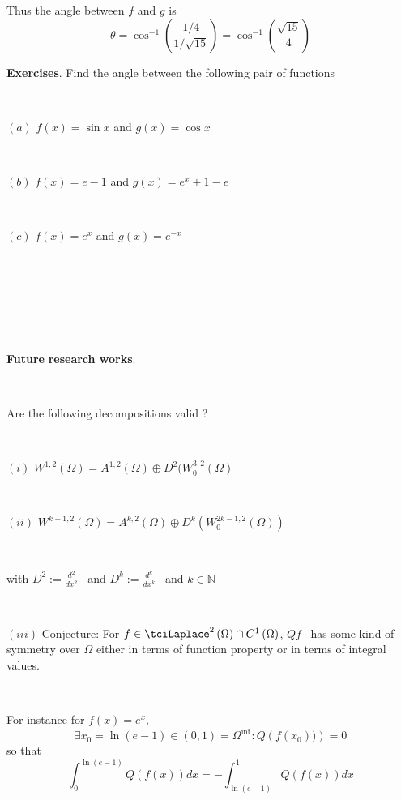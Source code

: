 \documentclass{amsproc}
\theoremstyle{plain}
\numberwithin{equation}{section}
\begin{document}
Thus the angle between $f$ and $g$ is 
\begin{equation*}
\theta =\cos ^{-1}\left( \frac{1/4}{1/\sqrt{15}}\right) =\cos ^{-1}\left( 
\frac{\sqrt{15}}{4}\right)
\end{equation*}

\textbf{Exercises}. Find the angle between the following pair of functions

\ 

$(a)$ $f(x)=\sin x$ and $g(x)=\cos x$

\ 

$(b)$ $f(x)=e-1$ and $g(x)=e^{x}+1-e$

\ 

$(c)$ $f(x)=e^{x}$ and $g(x)=e^{-x}$

\ \ \ \ \ 

\ \ 

$\overline{\ \ \ \ \ \ \ \ \ \ \ \ \ \ \ \ \ \ \ \ \ \ \ \ \ \ \ \ \ \ \ \ \
\ \ \ \ \ \ }$

\ \ \ \ \ \ \ \ \ 

\textbf{Future} \textbf{research works}.

\ \ \ \ \ 

Are the following decompositions valid ?

\ 

$\left( i\right) $ $W^{1,2}\left( \Omega \right) =A^{1,2}\left( \Omega
\right) \oplus D^{2}(W_{0}^{3,2}\left( \Omega \right) $

\ 

$\left( ii\right) $ $W^{k-1,2}\left( \Omega \right) =A^{k,2}\left( \Omega
\right) \oplus D^{k}\left( W_{0}^{2k-1,2}\left( \Omega \right) \right) $

\ 

with $D^{2}:=\frac{d^{2}}{dx^{2}}$ \ and $D^{k}:=\frac{d^{k}}{dx^{k}}$ \ and 
$k\in 
\mathbb{N}
$

\ 

$\left( iii\right) $ Conjecture: For $f\in \tciLaplace ^{2}\left( \Omega
\right) \cap C^{1}\left( \Omega \right) $, $Qf$ \ has some kind of symmetry
over $\Omega $ either in terms of function property or in terms of integral
values.

\ \ 

For instance for $f(x)=e^{x},$\begin{equation*}
\exists x_{0}=\ln \left( e-1\right) \in \left( 0,1\right) =\Omega ^{\text{int}}:Q\left( f(x_{0}))\right) =0
\end{equation*}so that 
\begin{equation*}
\int_{0}^{\ln \left( e-1\right) }Q(f(x))dx=-\int_{\ln \left( e-1\right)
}^{1}Q(f(x))dx
\end{equation*}
\end{document}
